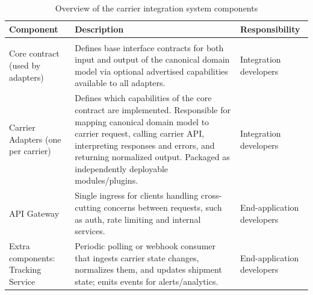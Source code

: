 \documentclass{imc-inf}
\begin{document}
\begin{table}[!htbp]
  \centering
  \small
  \begin{tabular}{@{}>{\raggedright\arraybackslash}p{3cm}p{8cm}>{\raggedright\arraybackslash}p{3cm}@{}}
    \toprule
    \textbf{Component}                 & \textbf{Description}                                                                                                                                                                                                                                                               & \textbf{Responsibility}    \\
    \midrule                                                                                                                                                                                                                                                                                                                                             \\[6pt]
    Core contract (used by adapters)   & Defines base interface contracts for both input and output of the canonical domain model via optional advertised capabilities available to all adapters.                                                                                                                           & Integration developers     \\[6pt]
    Carrier Adapters (one per carrier) & Defines which capabilities of the core contract are implemented. Responsible for mapping canonical domain model to carrier request, calling carrier API, interpreting responses and errors, and returning normalized output. Packaged as independently deployable modules/plugins. & Integration developers     \\[6pt]
    API Gateway                        & Single ingress for clients handling cross-cutting concerns between requests, such as auth, rate limiting and internal services.                                                                                                                                                    & End-application developers \\[6pt]
    Extra components: Tracking Service & Periodic polling or webhook consumer that ingests carrier state changes, normalizes them, and updates shipment state; emits events for alerts/analytics.                                                                                                                           & End-application developers \\[6pt]
    \bottomrule
  \end{tabular}
  \caption{Overview of the carrier integration system components}
  \label{tab:component-overview}
\end{table}
\end{document}
